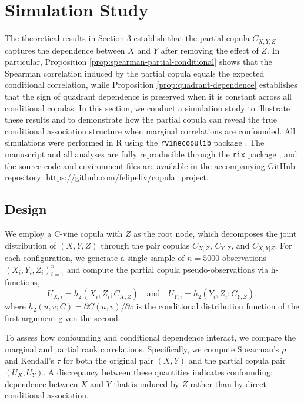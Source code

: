 \documentclass[
]{article}
\begin{document}
\section{Simulation Study}\label{simulation-study}

The theoretical results in Section 3 establish that the partial copula
\(C_{X,Y;Z}\) captures the dependence between \(X\) and \(Y\) after
removing the effect of \(Z\). In particular, Proposition
\ref{prop:spearman-partial-conditional} shows that the Spearman
correlation induced by the partial copula equals the expected
conditional correlation, while Proposition
\ref{prop:quadrant-dependence} establishes that the sign of quadrant
dependence is preserved when it is constant across all conditional
copulas. In this section, we conduct a simulation study to illustrate
these results and to demonstrate how the partial copula can reveal the
true conditional association structure when marginal correlations are
confounded. All simulations were performed in R using the
\texttt{rvinecopulib} package \citep{rvinecopulib}. The manuscript and
all analyses are fully reproducible through the \texttt{rix} package
\citep{rix}, and the source code and environment files are available in
the accompanying GitHub repository:
\url{https://github.com/felipelfv/copula_project}.

\subsection{Design}\label{design}

We employ a C-vine copula with \(Z\) as the root node, which decomposes
the joint distribution of \((X, Y, Z)\) through the pair copulas
\(C_{X,Z}\), \(C_{Y,Z}\), and \(C_{X,Y|Z}\). For each configuration, we
generate a single sample of \(n = 5000\) observations
\((X_i, Y_i, Z_i)_{i=1}^{n}\) and compute the partial copula
pseudo-observations via h-functions,
\[U_{X,i} = h_2(X_i, Z_i; C_{X,Z}) \quad \text{and} \quad U_{Y,i} = h_2(Y_i, Z_i; C_{Y,Z}),\]
where \(h_2(u, v; C) = \partial C(u,v)/\partial v\) is the conditional
distribution function of the first argument given the second.

To assess how confounding and conditional dependence interact, we
compare the marginal and partial rank correlations. Specifically, we
compute Spearman's \(\rho\) and Kendall's \(\tau\) for both the original
pair \((X, Y)\) and the partial copula pair \((U_X, U_Y)\). A
discrepancy between these quantities indicates confounding: dependence
between \(X\) and \(Y\) that is induced by \(Z\) rather than by direct
conditional association.
\end{document}
